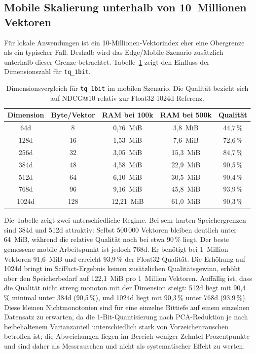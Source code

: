 \subsection{Mobile Skalierung unterhalb von 10~Millionen Vektoren}
%
Für lokale Anwendungen ist ein 10-Millionen-Vektorindex eher eine Obergrenze als ein typischer Fall.
Deshalb wird das Edge/Mobile-Szenario zusätzlich unterhalb dieser Grenze betrachtet.
Tabelle~\ref{tab:phase6_mobile_dims} zeigt den Einfluss der Dimensionszahl für \texttt{tq\_1bit}.
%
\begin{table}[htbp]
  \centering
  \caption[Dimensionsvergleich für \texttt{tq\_1bit} im mobilen Szenario]{Dimensionsvergleich für \texttt{tq\_1bit} im mobilen Szenario. Die Qualität bezieht sich auf NDCG@10 relativ zur Float32-1024d-Referenz.}
  \label{tab:phase6_mobile_dims}
  \begin{tabular}{ccccc}
    \toprule
    Dimension & Byte/Vektor & RAM bei 100k & RAM bei 500k & Qualität \\
    \midrule
    64d   & 8   & 0{,}76~MiB & 3{,}8~MiB  & 44{,}7\,\% \\
    128d  & 16  & 1{,}53~MiB & 7{,}6~MiB  & 72{,}6\,\% \\
    256d  & 32  & 3{,}05~MiB & 15{,}3~MiB & 84{,}7\,\% \\
    384d  & 48  & 4{,}58~MiB & 22{,}9~MiB & 90{,}5\,\% \\
    512d  & 64  & 6{,}10~MiB & 30{,}5~MiB & 90{,}4\,\% \\
    768d  & 96  & 9{,}16~MiB & 45{,}8~MiB & 93{,}9\,\% \\
    1024d & 128 & 12{,}21~MiB & 61{,}0~MiB & 90{,}3\,\% \\
    \bottomrule
  \end{tabular}
\end{table}
%
Die Tabelle zeigt zwei unterschiedliche Regime.
Bei sehr harten Speichergrenzen sind 384d und 512d attraktiv: Selbst 500\,000 Vektoren bleiben deutlich unter 64~MiB, während die relative Qualität noch bei etwa 90\,\% liegt.
Der beste gemessene mobile Arbeitspunkt ist jedoch 768d.
Er benötigt bei 1~Million Vektoren 91{,}6~MiB und erreicht 93{,}9\,\% der Float32-Qualität.
Die Erhöhung auf 1024d bringt im SciFact-Ergebnis keinen zusätzlichen Qualitätsgewinn, erhöht aber den Speicherbedarf auf 122{,}1~MiB pro 1~Million Vektoren.
Auffällig ist, dass die Qualität nicht streng monoton mit der Dimension steigt: 512d liegt mit 90{,}4\,\% minimal unter 384d (90{,}5\,\%), und 1024d liegt mit 90{,}3\,\% unter 768d (93{,}9\,\%). Diese kleinen Nichtmonotonien sind für eine einzelne Bittiefe auf einem einzelnen Datensatz zu erwarten, da die 1-Bit-Quantisierung nach PCA-Reduktion je nach beibehaltenem Varianzanteil unterschiedlich stark von Vorzeichenrauschen betroffen ist; die Abweichungen liegen im Bereich weniger Zehntel Prozentpunkte und sind daher als Messrauschen und nicht als systematischer Effekt zu werten.
